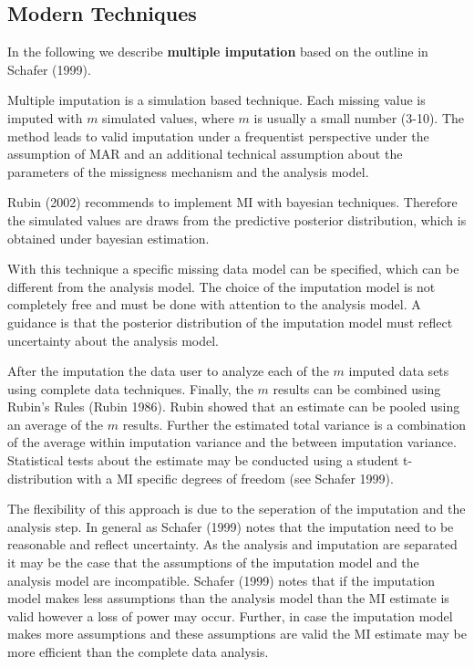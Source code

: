 \subsection{Modern Techniques} 
 In the following we describe \textbf{multiple imputation} based on the outline in Schafer (1999). \par  
Multiple imputation is a simulation based technique. Each missing value is imputed with $m$  simulated  values, where $m$ is usually a small number (3-10). The method leads to valid imputation under a frequentist perspective under the assumption of MAR and an additional technical assumption about the parameters of the missigness mechanism and the analysis model. \par 
Rubin (2002) recommends to implement MI with bayesian techniques. Therefore the simulated values are draws from the predictive posterior distribution, which is obtained under bayesian estimation.  \par
 With this technique a specific missing data model can be specified, which can be different from the analysis model. The choice of the imputation model is not completely free and must be done with attention to the analysis model. A guidance is that the posterior distribution of the imputation model must reflect uncertainty about the analysis model. \par 
After the imputation  the data user to analyze each of the $m$ imputed data sets using complete data techniques. Finally, the $m$ results can be combined using Rubin's Rules (Rubin 1986).  Rubin showed that an estimate can be pooled using an average of the $m$ results. Further the estimated total variance is a combination of the average within imputation variance and the between imputation variance. Statistical tests about the estimate may be conducted using a student t-distribution with a MI specific degrees of freedom (see Schafer 1999).   \par The flexibility of this approach is due to the seperation of the imputation and the analysis step. In general as Schafer (1999) notes that the imputation need to be reasonable and reflect uncertainty. As the analysis and imputation are separated it may be the case that the assumptions of the imputation model and the analysis model are incompatible. Schafer (1999) notes that if the imputation model makes less assumptions than the  analysis model than the MI estimate is valid however a loss of power may occur. Further, in case the imputation model makes more assumptions and these assumptions are valid the MI estimate may be more efficient than the complete data analysis. \par 
